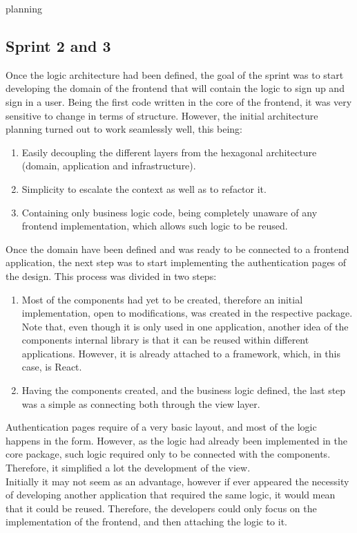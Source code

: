 planning\documentclass[../memory.tex]{subfiles}
\begin{document}
\subsection{Sprint 2 and 3}
Once the logic architecture had been defined, the goal of the sprint was to start
developing the domain of the frontend that will contain the logic to sign up and
sign in a user. Being the first code written in the core of the frontend, it was
very sensitive to change in terms of structure. However, the initial
architecture planning turned out to work seamlessly well, this being:
\begin{enumerate}[label = -]
	\item Easily decoupling the different layers from the hexagonal architecture
	      (domain, application and infrastructure).
	\item Simplicity to escalate the context as well as to refactor it.
	\item Containing only business logic code, being completely unaware of any
	      frontend implementation, which allows such logic to be reused.
\end{enumerate}
Once the domain have been defined and was ready to be connected to a frontend
application, the next step was to start implementing the authentication pages of
the design. This process was divided in two steps:
\begin{enumerate}[label = \arabic{*}.]
	\item Most of the components had yet to be created, therefore an initial
	      implementation, open to modifications, was created in the respective
	      package. Note that, even though it is only used in one application, another
	      idea of the components internal library is that it can be reused within
	      different applications. However, it is already attached to a framework,
	      which, in this case, is React.
	\item Having the components created, and the business logic defined, the last
	      step was a simple as connecting both through the view layer.
\end{enumerate}
Authentication pages require of a very basic layout, and most of the logic
happens in the form. However, as the logic had already been implemented in the
core package, such logic required only to be connected with the components.
Therefore, it simplified a lot the development of the view.
\\[8pt]
Initially it may not seem as an advantage, however if ever appeared the
necessity of developing another application that required the same logic, it
would mean that it could be reused. Therefore, the developers could only focus
on the implementation of the frontend, and then attaching the logic to it.
\end{document}
